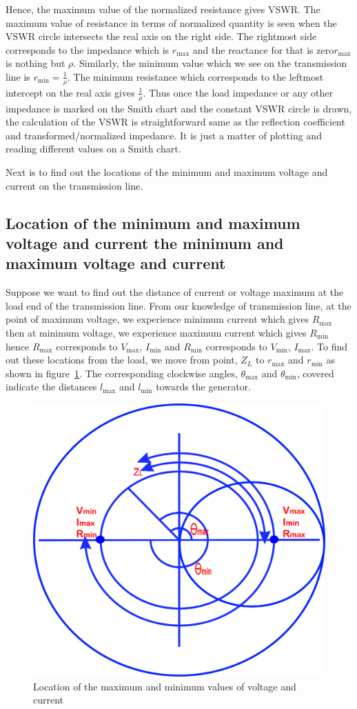 Hence, the maximum value of the normalized resistance gives VSWR. The maximum value of resistance  in terms of normalized quantity is seen when the VSWR circle intersects the real axis on the right side. The rightmost side corresponds to the impedance which is $r_\max$ and the reactance for that is zero\textemdash\;$r_\max$ is nothing but $\rho$. Similarly, the minimum value which we see on the transmission line is $r_\min = \frac{1}{\rho}$. The minimum resistance which corresponds to the leftmost intercept on the real axis gives $\frac{1}{\rho}$. Thus once the load impedance or any other impedance is marked on the Smith chart and the constant VSWR circle is drawn, the calculation of the VSWR is straightforward same as the reflection coefficient and transformed/normalized impedance. It is just a matter of plotting and reading different values on a Smith chart.

Next is to find out the locations of the minimum and maximum voltage and current  on the transmission line. 

\subsection{Location of the minimum and maximum voltage and current the minimum and maximum voltage and current }
Suppose we want to find out the distance of current or voltage maximum at the load end of the transmission line. From our knowledge of transmission line, at the point of maximum voltage, we experience minimum current which gives $R_\max$ then at minimum voltage, we experience maximum current which gives $R_\min$ hence $R_\max$ corresponds to $V_\max$, $I_\min$ and $R_\min$ corresponds to $V_\min$, $I_\max$. To find out these locations from the load, we move from point, $Z_L$ to $r_\max$ and $r_\min$ as shown in figure~\ref{fig:lkjtresx}. The corresponding clockwise angles, $\theta_\max$ and $\theta_\min$, covered indicate the distances $l_\max$ and $l_\min$ towards the generator.
\begin{figure}[h]
\centering
\includegraphics[width=0.7\linewidth]{graphics/lkjtresx}
\caption{Location of the maximum and minimum values of voltage and current}
\label{fig:lkjtresx}
\end{figure}

